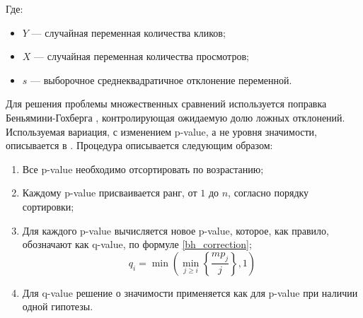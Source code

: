\documentclass[../document.tex]{subfiles}
\begin{document}
	\par Где:
	\begin{itemize}
		\item $Y$ --- случайная переменная количества кликов;
		\item $X$ --- случайная переменная количества просмотров;
		\item $s$ --- выборочное среднеквадратичное отклонение переменной.
	\end{itemize}
	\par Для решения проблемы множественных сравнений используется поправка Беньямини-Гохберга \cite{benjamini_hochberg}, контролирующая ожидаемую долю ложных отклонений. Используемая вариация, с изменением p-value, а не уровня значимости, описывается в \cite{benjamini_hochberg_yekutieli}. Процедура описывается следующим образом:
	\begin{enumerate}
		\item Все p-value необходимо отсортировать по возрастанию;
		\item Каждому p-value присваивается ранг, от $1$ до $n$, согласно порядку сортировки;
		\item Для каждого p-value вычисляется новое p-value, которое, как правило, обозначают как q-value, по формуле \ref{bh_correction};
		\begin{equation}
			\label{bh_correction}
			q_i=\min\left(\min_{j\ge i}\left\{\frac{mp_j}{j}\right\}, 1\right)
		\end{equation}
		\item Для q-value решение о значимости применяется как для p-value при наличии одной гипотезы.
	\end{enumerate}
\end{document}
